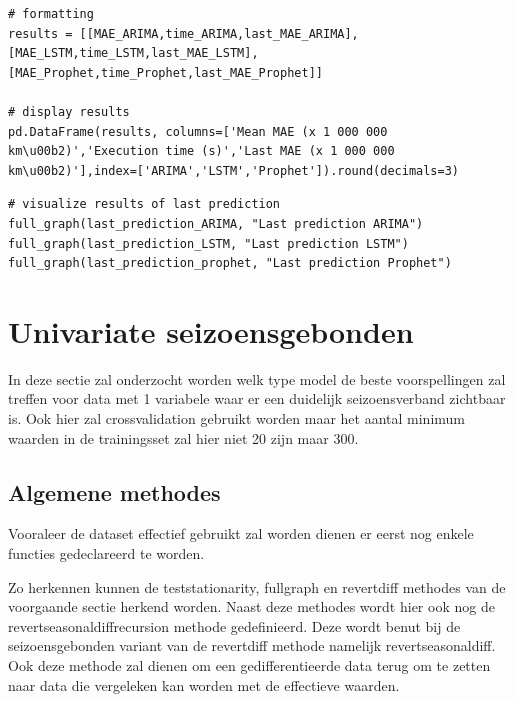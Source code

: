 \begin{verbatim}
# formatting
results = [[MAE_ARIMA,time_ARIMA,last_MAE_ARIMA],[MAE_LSTM,time_LSTM,last_MAE_LSTM],[MAE_Prophet,time_Prophet,last_MAE_Prophet]]

# display results
pd.DataFrame(results, columns=['Mean MAE (x 1 000 000 km\u00b2)','Execution time (s)','Last MAE (x 1 000 000 km\u00b2)'],index=['ARIMA','LSTM','Prophet']).round(decimals=3)

\end{verbatim}

\begin{verbatim}
# visualize results of last prediction
full_graph(last_prediction_ARIMA, "Last prediction ARIMA")
full_graph(last_prediction_LSTM, "Last prediction LSTM")
full_graph(last_prediction_prophet, "Last prediction Prophet")
\end{verbatim}

\clearpage

\section{Univariate seizoensgebonden}

In deze sectie zal onderzocht worden welk type model de beste voorspellingen zal treffen voor data met 1 variabele waar er een duidelijk seizoensverband zichtbaar is. Ook hier zal crossvalidation gebruikt worden maar het aantal minimum waarden in de trainingsset zal hier niet 20 zijn maar 300.

\subsection{Algemene methodes}

Vooraleer de dataset effectief gebruikt zal worden dienen er eerst nog enkele functies gedeclareerd te worden.

Zo herkennen kunnen de test\textunderscore stationarity, full\textunderscore graph en  revert\textunderscore diff methodes van de voorgaande sectie herkend worden. Naast deze methodes wordt hier ook nog de revert\textunderscore seasonal\textunderscore diff\textunderscore recursion methode gedefinieerd. Deze wordt benut bij de seizoensgebonden variant van de revert\textunderscore diff methode namelijk revert\textunderscore seasonal\textunderscore diff. Ook deze methode zal dienen om een gedifferentieerde data terug om te zetten naar data die vergeleken kan worden met de effectieve waarden.


